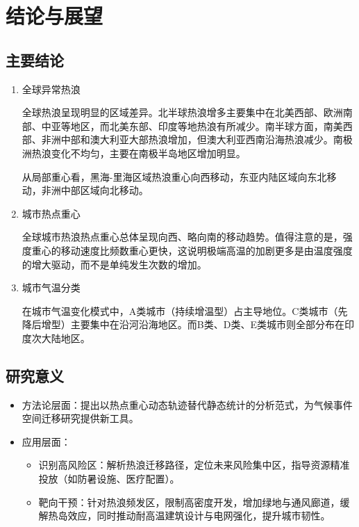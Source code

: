 \documentclass[a4paper,UTF8,scheme=chinese,zihao=-4,twoside]{ctexart}
\makeatletter
\newcommand{\初号}{\zihao{0}}
\newcommand{\小初}{\zihao{-0}}
\newcommand{\一号}{\zihao{1}}
\newcommand{\小一}{\zihao{-1}}
\newcommand{\二号}{\zihao{2}}
\newcommand{\小二}{\zihao{-2}}
\newcommand{\三号}{\zihao{3}}
\newcommand{\小三}{\zihao{-3}}
\newcommand{\四号}{\zihao{4}}
\newcommand{\小四}{\zihao{-4}}
\newcommand{\五号}{\zihao{5}}
\newcommand{\小五}{\zihao{-5}}
\newcommand{\六号}{\zihao{6}}
\newcommand{\小六}{\zihao{-6}}
\newcommand{\七号}{\zihao{7}}
\newcommand{\八号}{\zihao{8}}
\newcommand{\宋体}{\songti}
\newcommand{\黑体}{\heiti}
\newcommand{\仿宋}{\fangsong}
\newcommand{\楷书}{\kaishu}
\newcommand{\粗体}{\bfseries}
\newcommand{\斜体}{\itshape}
\newcommand\下划线[2][6em]{\hskip1pt\underline{\hb@xt@ #1{\hss#2\hss}}\hskip3pt}
\makeatother
\begin{document}
\section{结论与展望}

\subsection{主要结论}

\begin{enumerate}[label=\arabic*）]
    \item 全球异常热浪

        全球热浪呈现明显的区域差异。北半球热浪增多主要集中在北美西部、欧洲南部、中亚等地区，而北美东部、印度等地热浪有所减少。南半球方面，南美西部、非洲中部和澳大利亚大部热浪增加，但澳大利亚西南沿海热浪减少。南极洲热浪变化不均匀，主要在南极半岛地区增加明显。

        从局部重心看，黑海-里海区域热浪重心向西移动，东亚内陆区域向东北移动，非洲中部区域向北移动。

    \item 城市热点重心

        全球城市热浪热点重心总体呈现向西、略向南的移动趋势。值得注意的是，强度重心的移动速度比频数重心更快，这说明极端高温的加剧更多是由温度强度的增大驱动，而不是单纯发生次数的增加。

    \item 城市气温分类

        在城市气温变化模式中，A类城市（持续增温型）占主导地位。C类城市（先降后增型）主要集中在沿河沿海地区。而B类、D类、E类城市则全部分布在印度次大陆地区。
\end{enumerate}

\subsection{研究意义}

\begin{itemize}
    \item 方法论层面：提出以热点重心动态轨迹替代静态统计的分析范式，为气候事件空间迁移研究提供新工具。
    \item 应用层面：
        \begin{itemize}
            \item 识别高风险区：解析热浪迁移路径，定位未来风险集中区，指导资源精准投放（如防暑设施、医疗配置）。
            \item 靶向干预：针对热浪频发区，限制高密度开发，增加绿地与通风廊道，缓解热岛效应，同时推动耐高温建筑设计与电网强化，提升城市韧性。
        \end{itemize}
\end{itemize}
\end{document}
